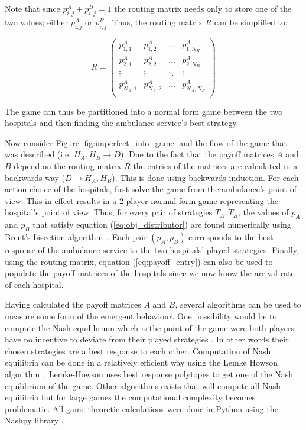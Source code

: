 Note that since \(p_{i,j}^A + p_{i,j}^B = 1\) the routing matrix needs only to
store one of the two values; either \(p_{i,j}^A\) or \(p_{i,j}^B\).
Thus, the routing matrix \(R\) can be simplified to:

\begin{equation}\label{eq:routing_matrix_simplified}
    R = 
    \begin{pmatrix}
        p_{1,1}^A & p_{1,2}^A & \dots & p_{1,N_B}^A \\
        p_{2,1}^A & p_{2,2}^A & \dots & p_{2,N_B}^A \\
        \vdots & \vdots & \ddots & \vdots \\
        p_{N_A,1}^A & p_{N_A,2}^A & \dots & p_{N_A,N_B}^A \\
    \end{pmatrix}
\end{equation}

The game can thus be partitioned into a normal form game between the
two hospitals and then finding the ambulance service's best strategy. 

Now consider Figure \ref{fig:imperfect_info_game} and the flow of the game that
was described (i.e. \(H_A, H_B \rightarrow D\)).
Due to the fact that the payoff matrices \(A\) and \(B\) depend on the routing 
matrix \(R\) the entries of the matrices are calculated in a backwards way 
(\(D \rightarrow H_A, H_B\)). 
This is done using backwards induction. 
For each action choice of the hospitals, first solve the game from the
ambulance's point of view.
This in effect results in a 2-player normal form game representing the
hospital's point of view.
Thus, for every pair of strategies \(T_A, T_B\), the values of \(p_A\) and 
\(p_B\) that satisfy equation (\ref{eq:obj_distributor}) are found
numerically using Brent's bisection algorithm~\cite{brent1973algorithms}.
Each pair \((p_A, p_B)\) corresponds to the best response of the ambulance
service to the two hospitals' played strategies.
Finally, using the routing matrix, equation (\ref{eq:payoff_entry}) can also be
used to populate the payoff matrices of the hospitals since we now know the 
arrival rate of each hospital.

Having calculated the payoff matrices \(A\) and \(B\), several algorithms can 
be used to measure some form of the emergent behaviour.
One possibility would be to compute the Nash equilibrium
which is the point of the game were both players have no 
incentive to deviate from their played strategies \cite{kreps1989nash}.
In other words their chosen strategies are a best response to each other.
Computation of Nash equilibria can be done in a relatively efficient way using 
the Lemke Howson algorithm~\cite{LemkeHowson}.
Lemke-Howson uses best response polytopes to get one of the Nash equilibrium of
the game. 
Other algorithms exists that will compute all Nash equilibria but 
for large games the computational complexity becomes problematic.
All game theoretic calculations were done in Python using the Nashpy library 
\cite{thenashpyproject}.

